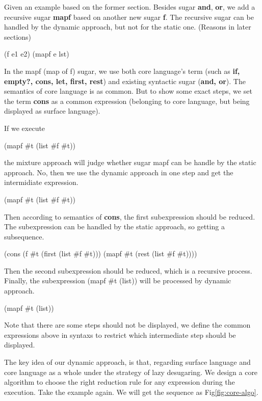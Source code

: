Given an example based on the former section. Besides sugar {\bfseries and}, {\bfseries or}, we add a recursive sugar {\bfseries mapf} based on another new sugar {\bfseries f}. The recursive sugar can be handled by the dynamic approach, but not for the static one. (Reasons in later sections)
\begin{Codes}
\small{(f e1 e2)} 
\small{(mapf e lst)} 
\end{Codes}

In the mapf (map of f) sugar, we use both core language's term (such as {\bfseries if, empty?, cons, let, first, rest}) and existing syntactic sugar ({\bfseries and, or}). The semantics of core language is as common. But to show some exact steps, we set the term {\bfseries cons} as a common expression (belonging to core language, but being displayed as surface language).


If we execute
\begin{Codes}
(mapf \#t (list \#f \#t))
\end{Codes}
 the mixture approach will judge whether sugar mapf can be handle by the static approach. No, then we use the dynamic approach in one step and get the intermidiate expression.
\begin{Codes}
    (mapf \#t (list \#f \#t))
\end{Codes}
Then according to semantics of {\bfseries cons}, the first subexpression should be reduced. The subexpression can be handled by the static approach, so getting a subsequence.
\begin{Codes}
    (cons (f \#t (first (list \#f \#t))) (mapf \#t (rest (list \#f \#t))))
\end{Codes}
Then the second subexpression should be reduced, which is a recursive process. Finally, the subexpression (mapf \#t (list)) will be processed by dynamic approach.
\begin{Codes}
   (mapf \#t (list))
\end{Codes}
Note that there are some steps should not be displayed, we define the common expressions above in syntaxs to restrict which intermediate step should be displayed.


The key idea of our dynamic approach, is that, regarding surface language and core language as a whole under the strategy of lazy desugaring. We design a core algorithm to choose the right reduction rule for any expression during the execution. Take the example
 again. We will get the sequence as Fig\ref{fig:core-algo}.

